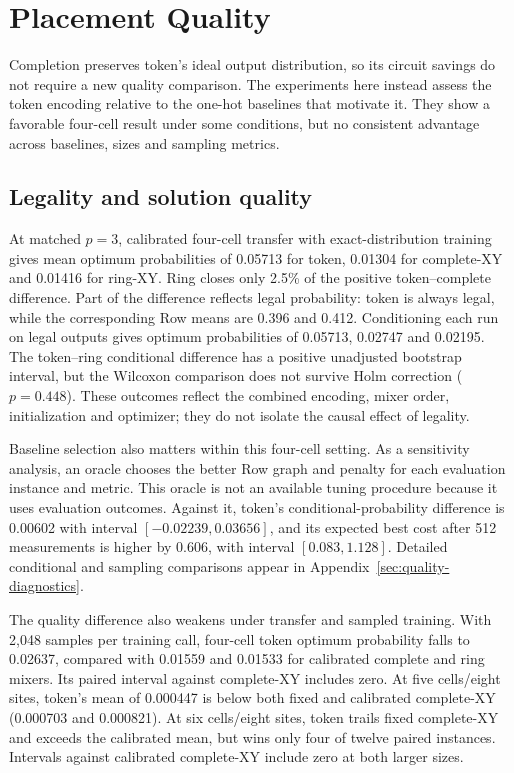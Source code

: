 \documentclass[manuscript,screen,review]{acmart}
\begin{document}
\section{Placement Quality}
\label{sec:quality}
Completion preserves token's ideal output distribution, so its circuit
savings do not require a new quality comparison. The experiments here
instead assess the token encoding relative to the one-hot baselines that
motivate it. They show a favorable four-cell result under some conditions,
but no consistent advantage across baselines, sizes and sampling metrics.

\subsection{Legality and solution quality}
At matched $p=3$, calibrated four-cell transfer with exact-distribution
training gives mean optimum probabilities of 0.05713 for token, 0.01304
for complete-XY and 0.01416 for ring-XY. Ring closes only 2.5\% of the
positive token--complete difference. Part of the difference reflects legal
probability: token is always legal, while the corresponding Row means are
0.396 and 0.412. Conditioning each run on legal outputs gives optimum
probabilities of 0.05713, 0.02747 and 0.02195. The token--ring conditional
difference has a positive unadjusted bootstrap interval, but the
Wilcoxon comparison does not survive Holm correction ($p=0.448$).
These outcomes reflect the combined encoding, mixer order, initialization
and optimizer; they do not isolate the causal effect of legality.

Baseline selection also matters within this four-cell setting. As a
sensitivity analysis, an oracle chooses the better Row graph and penalty
for each evaluation instance and metric. This oracle is not an available
tuning procedure because it uses evaluation outcomes. Against it, token's
conditional-probability difference is 0.00602 with interval
$[-0.02239,0.03656]$, and its expected best cost after 512 measurements is
higher by 0.606, with interval $[0.083,1.128]$. Detailed conditional and
sampling comparisons appear in Appendix~\ref{sec:quality-diagnostics}.

The quality difference also weakens under transfer and sampled training.
With 2,048 samples per training call, four-cell token optimum probability
falls to 0.02637, compared with 0.01559 and 0.01533 for calibrated complete
and ring mixers. Its paired interval against complete-XY includes zero.
At five cells/eight sites, token's mean of 0.000447 is below both fixed
and calibrated complete-XY (0.000703 and 0.000821). At six cells/eight
sites, token trails fixed complete-XY and exceeds the calibrated mean,
but wins only four of twelve paired instances. Intervals against calibrated
complete-XY include zero at both larger sizes.
\end{document}
